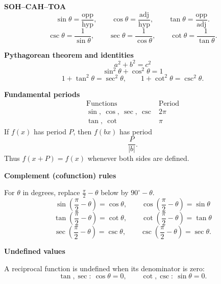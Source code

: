 \documentclass[10pt]{article}
\begin{document}
\hfill
\begin{minipage}[t]{0.47\textwidth}
\textbf{SOH--CAH--TOA}
\[
\sin\theta=\frac{\text{opp}}{\text{hyp}},\qquad
\cos\theta=\frac{\text{adj}}{\text{hyp}},\qquad
\tan\theta=\frac{\text{opp}}{\text{adj}}.
\]
\[
\csc\theta=\frac1{\sin\theta},\qquad
\sec\theta=\frac1{\cos\theta},\qquad
\cot\theta=\frac1{\tan\theta}.
\]

\textbf{Pythagorean theorem and identities}
\[
a^2+b^2=c^2
\]
\[
\sin^2\theta+\cos^2\theta=1
\]
\[
1+\tan^2\theta=\sec^2\theta,
\qquad
1+\cot^2\theta=\csc^2\theta.
\]

\textbf{Fundamental periods}
\[
\begin{array}{c|c}
\text{Functions} & \text{Period}\\ \hline
\sin,\ \cos,\ \sec,\ \csc & 2\pi\\
\tan,\ \cot & \pi
\end{array}
\]
If $f(x)$ has period $P$, then $f(bx)$ has period
\[
\frac{P}{|b|}.
\]
Thus $f(x+P)=f(x)$ whenever both sides are defined.

\textbf{Complement (cofunction) rules}\par
For $\theta$ in degrees, replace $\frac\pi2-\theta$ below by $90^\circ-\theta$.
\[
\sin\left(\frac\pi2-\theta\right)=\cos\theta,
\qquad
\cos\left(\frac\pi2-\theta\right)=\sin\theta
\]
\[
\tan\left(\frac\pi2-\theta\right)=\cot\theta,
\qquad
\cot\left(\frac\pi2-\theta\right)=\tan\theta
\]
\[
\sec\left(\frac\pi2-\theta\right)=\csc\theta,
\qquad
\csc\left(\frac\pi2-\theta\right)=\sec\theta.
\]

\textbf{Undefined values}\par
A reciprocal function is undefined when its denominator is zero:
\[
\tan,\sec:\ \cos\theta=0,
\qquad
\cot,\csc:\ \sin\theta=0.
\]
\end{minipage}
\end{document}
